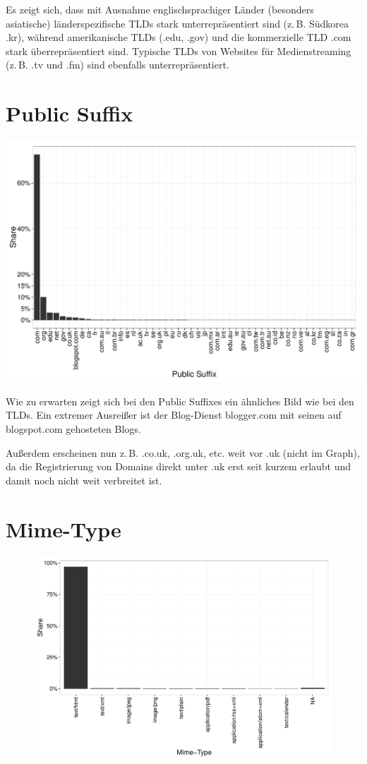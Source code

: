 \documentclass[a4paper,12pt,titlepage=false]{scrreprt}
\begin{document}
Es zeigt sich, dass mit Ausnahme englischsprachiger Länder (besonders asiatische) länderspezifische TLDs stark unterrepräsentiert sind (z.\,B. Südkorea .kr), während amerikanische TLDs (.edu, .gov) und die kommerzielle TLD .com stark überrepräsentiert sind. Typische TLDs von Websites für Medienstreaming (z.\,B. .tv und .fm) sind ebenfalls unterrepräsentiert.

\section{Public Suffix}

\begin{center}
    \includegraphics[width=.9\textwidth]{plots/plot_pub_suffixes_top50}
\end{center}

\noindent
Wie zu erwarten zeigt sich bei den Public Suffixes ein ähnliches Bild wie bei den TLDs. Ein extremer Ausreißer ist der Blog-Dienst blogger.com mit seinen auf blogspot.com gehosteten Blogs.

Außerdem erscheinen nun z.\,B. .co.uk, .org.uk, etc. weit vor .uk (nicht im Graph), da die Registrierung von Domains direkt unter .uk erst seit kurzem erlaubt und damit noch nicht weit verbreitet ist.

\section{Mime-Type}

\begin{figure}
    \includegraphics[width=.6\textwidth]{plots/plot_mime}
\end{figure}
\end{document}
